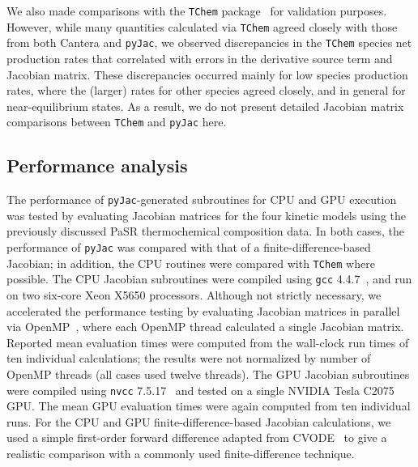 \documentclass[preprint,12pt]{elsarticle}
\begin{document}
{We also made comparisons with the \texttt{TChem} package~\cite{Safta:2011vn} for validation purposes.
However, while many quantities calculated via \texttt{TChem} agreed closely with those from both Cantera and \texttt{pyJac}, we observed discrepancies in the \texttt{TChem} species net production rates that correlated with errors in the derivative source term and Jacobian matrix.
These discrepancies occurred mainly for low species production rates, where the (larger) rates for other species agreed closely, and in general for near-equilibrium states.
As a result, we do not present detailed Jacobian matrix comparisons between \texttt{TChem} and \texttt{pyJac} here.

\subsection{Performance analysis}
\label{s:performance}

The performance of \texttt{pyJac}-generated subroutines for CPU and GPU execution was tested by evaluating Jacobian matrices for the four kinetic models using the previously discussed PaSR thermochemical composition data.
In both cases, the performance of \texttt{pyJac} was compared with that of a finite-difference-based Jacobian; in addition, the CPU routines were compared with \texttt{TChem} where possible.
The CPU Jacobian subroutines were compiled using \texttt{gcc} 4.4.7~\cite{gcc-4.4.7}, and run on two six-core Xeon X5650 processors.
Although not strictly necessary, we accelerated the performance testing by evaluating Jacobian matrices in parallel via OpenMP~\cite{Dagum:1998}, where each OpenMP thread calculated a single Jacobian matrix.
Reported mean evaluation times were computed from the wall-clock run times of ten individual calculations; the results were not normalized by number of OpenMP threads (all cases used twelve threads).
The GPU Jacobian subroutines were compiled using \texttt{nvcc} 7.5.17~\cite{cuda-7.5} and tested on a single NVIDIA Tesla C2075 GPU.
The mean GPU evaluation times were again computed from ten individual runs.
For the CPU and GPU finite-difference-based Jacobian calculations, we used a simple first-order forward difference adapted from CVODE~\cite{Hindmarsh:2005hg} to give a realistic comparison with a commonly used finite-difference technique.

}
\end{document}
